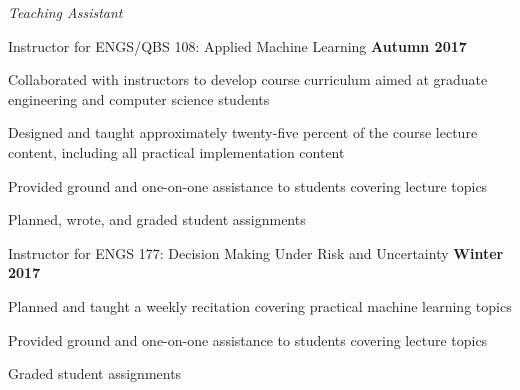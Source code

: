 \documentclass[10pt]{article}
\newcommand{\halfblankline}{\quad\vspace{-0.5\baselineskip}\pagebreak[3]}
\begin{document}
\begin{innerlist}
\item[] \textit{Teaching Assistant}%
    \begin{innerlist}
        \item Instructor for ENGS/QBS 108: Applied Machine Learning
            \hfill \textbf{Autumn 2017}
        \begin{innerlist}
            \item Collaborated with instructors to develop course curriculum aimed at graduate engineering and computer science students
            \item Designed and taught approximately twenty-five percent of the course lecture content, including all practical implementation content
            \item Provided ground and one-on-one assistance to students covering lecture topics
            \item Planned, wrote, and graded student assignments
        \end{innerlist}


        \item Instructor for ENGS 177: Decision Making Under Risk and Uncertainty
            \hfill \textbf{Winter 2017}
        \begin{innerlist}
            \item Planned and taught a weekly recitation covering practical machine learning topics
            \item Provided ground and one-on-one assistance to students covering lecture topics
            \item Graded student assignments
        \end{innerlist}

    \end{innerlist}

\end{innerlist}
\end{document}
